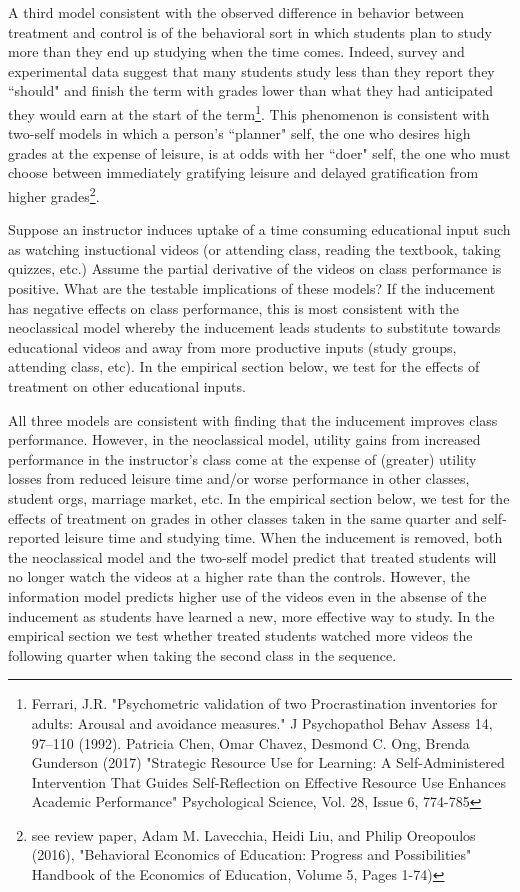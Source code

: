 \documentclass[12pt]{article}
\begin{document}
A third model consistent with the observed difference in behavior between treatment and control is of the behavioral sort in which students plan to study more than they end up studying when the time comes. Indeed, survey and experimental data suggest that many students study less than they report they ``should" and finish the term with grades lower than what they had anticipated they would earn at the start of the term\footnote{Ferrari, J.R. "Psychometric validation of two Procrastination inventories for adults: Arousal and avoidance measures." J Psychopathol Behav Assess 14, 97–110 (1992). Patricia Chen, Omar Chavez, Desmond C. Ong, Brenda Gunderson (2017) "Strategic Resource Use for Learning: A Self-Administered Intervention That Guides Self-Reflection on Effective Resource Use Enhances Academic Performance" Psychological Science, Vol. 28, Issue 6, 774-785}. This phenomenon is consistent with two-self models in which a person's ``planner" self, the one who desires high grades at the expense of leisure, is at odds with her ``doer" self, the one who must choose between immediately gratifying leisure and delayed gratification from higher grades\footnote{see review paper, Adam M. Lavecchia, Heidi Liu, and Philip Oreopoulos (2016), "Behavioral Economics of Education: Progress and Possibilities"  Handbook of the Economics of Education, Volume 5, Pages 1-74)}. 

Suppose an instructor induces uptake of a time consuming educational input such as watching instuctional videos (or attending class, reading the textbook, taking quizzes, etc.)  Assume the partial derivative of the videos on class performance is positive.  What are the testable implications of these models? If the inducement has negative effects on class performance, this is most consistent with the neoclassical model whereby the inducement leads students to substitute towards educational videos and away from more productive inputs (study groups, attending class, etc).  In the empirical section below, we test for the effects of treatment on other educational inputs.  

All three models are consistent with finding that the inducement improves class performance.  However, in the neoclassical model, utility gains from increased performance in the instructor's class come at the expense of (greater) utility losses from reduced leisure time and/or worse performance in other classes, student orgs, marriage market, etc. In the empirical section below, we test for the effects of treatment on grades in other classes taken in the same quarter and self-reported leisure time and studying time.  When the inducement is removed, both the neoclassical model and the two-self model predict that treated students will no longer watch the videos at a higher rate than the controls.  However, the information model predicts higher use of the videos even in the absense of the inducement as students have learned a new, more effective way to study.  In the empirical section we test whether treated students watched more videos the following quarter when taking the second class in the sequence.
\end{document}
